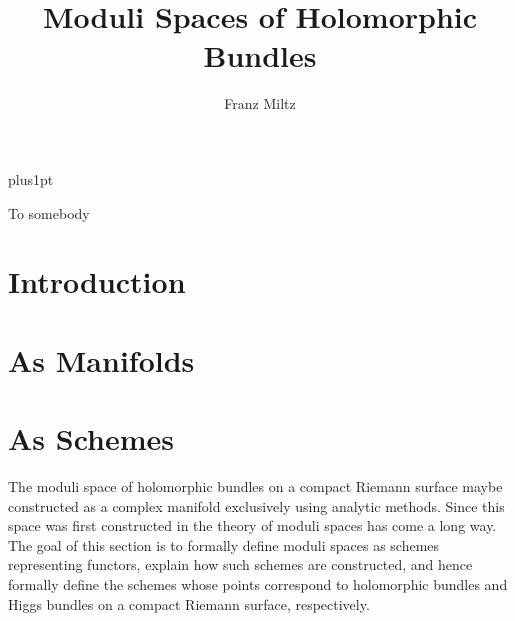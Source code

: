 \documentclass[12pt]{ociamthesis}  %
\title{Moduli Spaces of Holomorphic Bundles}   %
\author{Franz Miltz}             %
\begin{document}
\baselineskip=18pt plus1pt

\setcounter{secnumdepth}{3}
\setcounter{tocdepth}{3}


\maketitle                  %
\begin{dedication}
  To somebody
\end{dedication}
\begin{acknowledgements}

\end{acknowledgements}
\begin{abstract}

\end{abstract}

\begin{romanpages}          %
  \tableofcontents            %
\end{romanpages}            %

\chapter{Introduction}

\chapter{As Manifolds}

\chapter{As Schemes}

The moduli space of holomorphic bundles on a compact Riemann
surface maybe constructed as a complex manifold exclusively
using analytic methods. Since this space was first constructed
in \missingcitation
the theory of moduli spaces has come a long way.
The goal of this section is to formally define moduli spaces
as schemes representing functors, explain how such schemes
are constructed, and hence formally define the schemes whose
points correspond to holomorphic bundles and Higgs bundles
on a compact Riemann surface, respectively.
\end{document}
